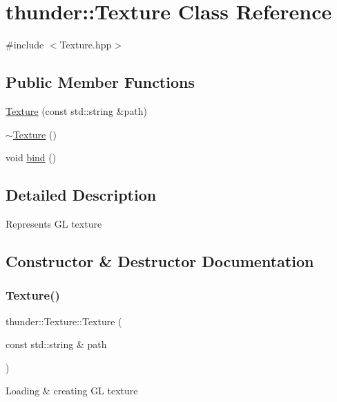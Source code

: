 \hypertarget{classthunder_1_1_texture}{}\section{thunder\+:\+:Texture Class Reference}
\label{classthunder_1_1_texture}


{\ttfamily \#include $<$Texture.\+hpp$>$}

\subsection*{Public Member Functions}
\begin{DoxyCompactItemize}
\item 
\mbox{\hyperlink{classthunder_1_1_texture_a717b7ba6af9b0a35cc003a16c5ea0695}{Texture}} (const std\+::string \&path)
\item 
\mbox{\hyperlink{classthunder_1_1_texture_ad24149a27adb027ff78462fb492b5f35}{$\sim$\+Texture}} ()
\item 
void \mbox{\hyperlink{classthunder_1_1_texture_a3159825482c30bb34054734ddb48b526}{bind}} ()
\end{DoxyCompactItemize}


\subsection{Detailed Description}
Represents GL texture 

\subsection{Constructor \& Destructor Documentation}
\mbox{\label{classthunder_1_1_texture_a717b7ba6af9b0a35cc003a16c5ea0695}} 
\subsubsection{\texorpdfstring{Texture()}{Texture()}}
{\footnotesize\ttfamily thunder\+::\+Texture\+::\+Texture (\begin{DoxyParamCaption}\item[{const std\+::string \&}]{path }\end{DoxyParamCaption})}

Loading \& creating GL texture


